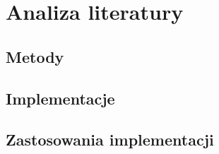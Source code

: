\section{Analiza literatury}
\label{sec:analiza_literatury}

\subsection{Metody}




\subsection{Implementacje}

\subsection{Zastosowania implementacji}


